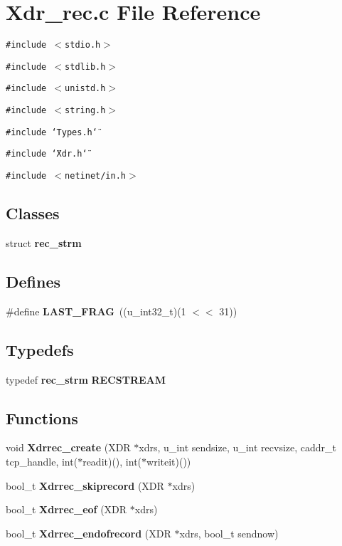 \section{Xdr\_\-rec.c File Reference}
\label{Xdr__rec_8c}
{\tt \#include $<$stdio.h$>$}\par
{\tt \#include $<$stdlib.h$>$}\par
{\tt \#include $<$unistd.h$>$}\par
{\tt \#include $<$string.h$>$}\par
{\tt \#include \char`\"{}Types.h\char`\"{}}\par
{\tt \#include \char`\"{}Xdr.h\char`\"{}}\par
{\tt \#include $<$netinet/in.h$>$}\par
\subsection*{Classes}
\begin{CompactItemize}
\item 
struct {\bf rec\_\-strm}
\end{CompactItemize}
\subsection*{Defines}
\begin{CompactItemize}
\item 
\#define {\bf LAST\_\-FRAG}\ ((u\_\-int32\_\-t)(1 $<$$<$ 31))
\end{CompactItemize}
\subsection*{Typedefs}
\begin{CompactItemize}
\item 
typedef {\bf rec\_\-strm} {\bf RECSTREAM}
\end{CompactItemize}
\subsection*{Functions}
\begin{CompactItemize}
\item 
void {\bf Xdrrec\_\-create} (XDR $\ast$xdrs, u\_\-int sendsize, u\_\-int recvsize, caddr\_\-t tcp\_\-handle, int($\ast$readit)(), int($\ast$writeit)())
\item 
bool\_\-t {\bf Xdrrec\_\-skiprecord} (XDR $\ast$xdrs)
\item 
bool\_\-t {\bf Xdrrec\_\-eof} (XDR $\ast$xdrs)
\item 
bool\_\-t {\bf Xdrrec\_\-endofrecord} (XDR $\ast$xdrs, bool\_\-t sendnow)
\end{CompactItemize}


